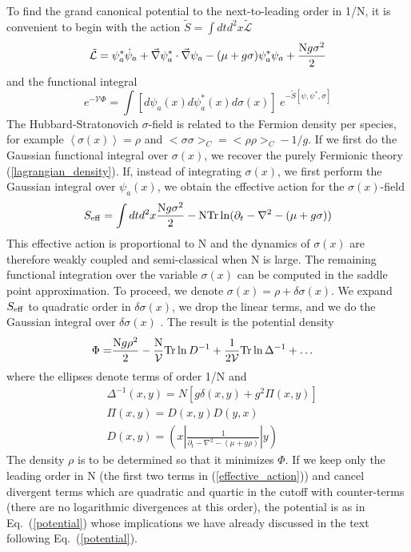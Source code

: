 \documentclass[twocolumn,secnumarabic,amssymb, nobibnotes, aps, prd]{revtex4}
\begin{document}
 To find the grand canonical potential to the next-to-leading order in 1/N, 
it is convenient to begin with the action  $\tilde S = \int dtd^2x\tilde{\mathcal L} $
\begin{align}
\tilde{\mathcal L} = \psi_a^*\dot\psi_a+\vec\nabla\psi_a^*\cdot\vec\nabla\psi_a
 -(\mu+ g\sigma)\psi_a^*\psi_a
  +\frac{{\rm  N}g\sigma^2}{2}  
\end{align}
and  the functional integral
\begin{equation}\label{pathintegral}
 e^{-{\mathcal V}\Phi}=\int [d\psi_a(x) d\psi^*_a(x)d\sigma(x)] ~e^{-\tilde S[\psi,\psi^*,\sigma] }
\end{equation}
The Hubbard-Stratonovich $\sigma$-field is  related to the Fermion density per species, for example
$
\left< \sigma(x)\right>=   \rho $ and $<\sigma\sigma>_C=<\rho\rho>_C-1/g$. 
If we first do the Gaussian functional integral
over  $\sigma(x)$,  we recover the purely Fermionic theory  (\ref{lagrangian_density}).  
If, instead of integrating $\sigma(x)$, we first perform 
the Gaussian integral over $\psi_a(x)$, we obtain the effective action for the $\sigma(x)$-field
\begin{equation}
S_{\rm eff}=  \int dtd^2x \frac{{\rm  N}g\sigma^2}{2}  
-{\rm  N}{\rm Tr}\ln(\partial_t-\nabla^2-(\mu+g\sigma))
\end{equation}
This effective action is proportional to N and the dynamics of $\sigma(x)$ are therefore weakly coupled 
and semi-classical when N is large.  
The remaining functional integration over the variable $\sigma(x)$ can be computed  in the 
 saddle point approximation.  
To proceed, we
 denote $\sigma(x)=\rho+\delta\sigma(x)$.   
  We expand $S_{\rm eff}$ to quadratic order in $\delta\sigma(x)$,  we drop the linear terms,  
 and we do the Gaussian integral over $\delta\sigma(x)$ \cite{Jackiw:1974}.  The result is
 the potential density
 \begin{align}
 \Phi =& \frac{{\rm  N}g\rho^2}{2}  
-\frac{\rm  N}{\mathcal V}{\rm Tr}\ln D^{-1} 
+\frac{1}{2\mathcal V}{\rm Tr}\ln \Delta^{-1}
+\ldots
\label{effective_action}\end{align}
where  the ellipses denote terms of order 1/N and 
\begin{align}
&\Delta^{-1}(x,y)=N\left[g\delta(x,y)+g^2\Pi(x,y)\right]\label{PI}
\\
&
\Pi(x,y)=D(x,y)D(y,x)
\label{S}\\
&
D(x,y)=(x|\frac{1}{\partial_t-\nabla^2-(\mu+g\rho)} |y) \label{D}
 \end{align}
 The density $\rho$ is to be determined so that it minimizes $\Phi$.
 If we  keep only the leading
 order in N (the first two terms in (\ref{effective_action})) and cancel divergent terms which are quadratic and quartic in the cutoff 
 with counter-terms (there are no logarithmic divergences 
 at this order), the potential  is as in Eq.\  (\ref{potential}) whose
 implications we have already discussed in the text following Eq.\  (\ref{potential}).
 
\end{document}

